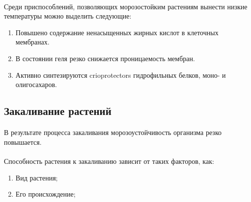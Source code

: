 \paragraph*{}Среди приспособлений, позволяющих морозостойким растениям вынести низкие температуры можно выделить следующие:

\begin{enumerate}
	\item Повышено содержание ненасыщенных жирных кислот в клеточных мембранах. 
	\item В состоянии геля резко снижается проницаемость мембран. 
	\item Активно синтезируются \gls{crioprotectors} гидрофильных белков, моно- и олигосахаров. 

\end{enumerate}



\subsection*{Закаливание растений}

\paragraph*{}


\paragraph*{}В результате процесса закаливания морозоустойчивость организма резко повышается. 


\paragraph*{}Способность растения к закаливанию зависит от таких факторов, как:

\begin{enumerate}
	\item Вид растения;
	\item Его происхождение;

\end{enumerate}

